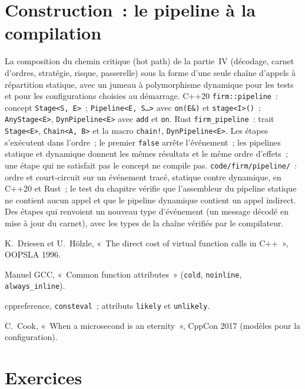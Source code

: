 \section{Construction~: le pipeline à la compilation}\label{bld:ll:cpp-for-latency-ii-compile-time:pipeline}

\begin{build}
 La composition du chemin critique (hot path) de la partie~IV (décodage, carnet d'ordres, stratégie, risque, passerelle)
sous la forme d'une seule chaîne d'appels à répartition statique, avec un jumeau à polymorphisme dynamique pour les tests et pour les configurations choisies au démarrage.
 C++20 \texttt{firm::pipeline}~: concept \texttt{Stage<S, E>}~; \texttt{Pipeline<E, S\dots>} avec
\texttt{on(E\&)} et \texttt{stage<I>()}~; \texttt{AnyStage<E>}, \texttt{DynPipeline<E>} avec \texttt{add} et \texttt{on}.
Rust \texttt{firm\_pipeline}~: trait \texttt{Stage<E>}, \texttt{Chain<A, B>} et la macro \texttt{chain!},
\texttt{DynPipeline<E>}.
 Les étapes s'exécutent dans l'ordre~; le premier \texttt{false} arrête l'événement~; les pipelines statique et dynamique donnent les
mêmes résultats et le même ordre d'effets~; une étape qui ne satisfait pas le concept ne compile pas.
 \texttt{code/firm/pipeline/}~: ordre et court-circuit sur un événement tracé, statique contre dynamique, en
C++20 et Rust~; le test du chapitre vérifie que l'assembleur du pipeline statique ne contient aucun appel et que le pipeline dynamique
contient un appel indirect.
 Des étapes qui renvoient un nouveau type d'événement (un message décodé en mise à jour du carnet), avec les types de la chaîne vérifiés
par le compilateur.
\end{build}

\begin{omsources}
\item K.~Driesen et U.~Hölzle, «~The direct cost of virtual function calls in C++~», OOPSLA 1996.
\item Manuel GCC, «~Common function attributes~» (\texttt{cold}, \texttt{noinline}, \texttt{always\_inline}).
\item cppreference, \texttt{consteval}~; attributs \texttt{likely} et \texttt{unlikely}.
\item C.~Cook, «~When a microsecond is an eternity~», CppCon 2017 (modèles pour la configuration).
\end{omsources}

\section{Exercices}

